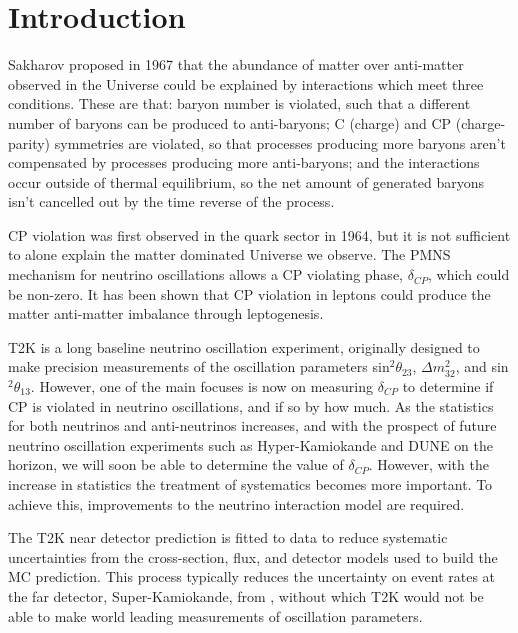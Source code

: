 \chapter{Introduction} \label{sec:introductions}

Sakharov\cite{sakharov} proposed in 1967 that the abundance of matter over anti-matter observed in the Universe could be explained by interactions which meet three conditions. These are that: baryon number is violated, such that a different number of baryons can be produced to anti-baryons; C (charge) and CP (charge-parity) symmetries are violated, so that processes producing more baryons aren't compensated by processes producing more anti-baryons; and the interactions occur outside of thermal equilibrium, so the net amount of generated baryons isn't cancelled out by the time reverse of the process. 

CP violation was first observed in the quark sector in 1964\cite{quarkcpv}, but it is not sufficient to alone explain the matter dominated Universe we observe. The PMNS mechanism for neutrino oscillations allows a CP violating phase, $\delta_{CP}$, which could be non-zero. It has been shown that CP violation in leptons could produce the matter anti-matter imbalance through leptogenesis\cite{leptogenesis}. 

T2K \cite{PhysRevLett.121.171802} is a long baseline neutrino oscillation experiment, originally designed to make precision measurements of the oscillation parameters sin$^2\theta_{23}$, $\Delta m^2_{32}$, and sin$^2\theta_{13}$. However, one of the main focuses is now on measuring $\delta_{CP}$ to determine if CP is violated in neutrino oscillations, and if so by how much. As the statistics for both neutrinos and anti-neutrinos increases, and with the prospect of future neutrino oscillation experiments such as Hyper-Kamiokande \cite{Abe:2018uyc} and DUNE \cite{acciarri2016longbaseline} on the horizon, we will soon be able to determine the value of  $\delta_{CP}$. However, with the increase in statistics the treatment of systematics becomes more important. To achieve this, improvements to the neutrino interaction model are required.

The T2K near detector prediction is fitted to data to reduce systematic uncertainties from the cross-section, flux, and detector models used to build the MC prediction. This process typically reduces the uncertainty on event rates at the far detector, Super-Kamiokande, from , without which T2K would not be able to make world leading measurements of oscillation parameters.

